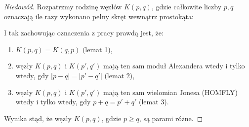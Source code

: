 \begin{proof}[Niedowód]
    Rozpatrzmy rodzinę węzłów $K(p, q)$, gdzie całkowite liczby $p, q$ oznaczają ile razy wykonano pełny skręt wewnątrz prostokąta:
\begin{comment}
    \[
        \begin{tikzpicture}[baseline=-0.65ex,scale=0.08]
        \begin{knot}[clip width=5, flip crossing/.list={1,3,6,7}]
        \strand [thick] (0, 25)
            [in=left, out=right] to (20, 25)
            [in=up, out=right] to (25, 5)
            [in=down, out=down] to (15, 5)
            [in=right, out=up] to (10, 20)
            [in=up, out=left] to (5, 15)
            [in=up, out=down] to (5, 5)
            [in=left, out=down] to (15, -10)
        ;
        \strand [thick] (15, -10)
            [in=down, out=right] to (20, 10)
            [in=up, out=up] to (30, 10)
            [in=right, out=down] to (20, -25)
            [in=down, out=left] to (5, -20)
            [in=down, out=up] to (5, -10)
        ;
        \strand [thick] (5, -10)
            [in=down, out=up] to (15, 0)
            [in=right, out=up] to (0, 5)
            [in=up, out=left] to (-15, 0)
            [in=up, out=down] to (-5, -10)
            ;
        \strand [thick] (-15, -10)
            [in=down, out=left] to (-20, 10)
            [in=up, out=up] to (-30, 10)
            [in=left, out=down] to (-20, -25)
            [in=down, out=right] to (-5, -20)
            [in=down, out=up] to (-5, -10)
        ;
        \strand [thick] (0, 25)
            [in=right, out=left] to (-20, 25)
            [in=up, out=left] to (-25, 5)
            [in=down, out=down] to (-15, 5)
            [in=left, out=up] to (-10, 20)
            [in=up, out=right] to (-5, 15)
            [in=up, out=down] to (-5, 5)
            [in=right, out=down] to (-15, -10)
        ;
        \draw[fill=blue!10!white,thick] (-5, 10) rectangle (5, 15);
        \draw[fill=blue!10!white,thick] (-5, -17.5) rectangle (5, -12.5);
        \node at (0, 12.5) {$p$};
        \node at (0, -15) {$q$};
        \end{knot}
        \end{tikzpicture}
    \]
\end{comment}
    I tak zachowując oznaczenia z pracy \cite{kanenobu1986} prawdą jest, że:
    \begin{enumerate}
        \item $K(p,q) = K(q,p)$ (lemat 1),
        \item węzły $K(p,q)$ i $K(p', q')$ mają ten sam moduł Alexandera wtedy i tylko wtedy, gdy $|p-q| = |p'-q'|$ (lemat 2),
        \item węzły $K(p,q)$ i $K(p', q')$ mają ten sam wielomian Jonesa (HOMFLY) wtedy i tylko wtedy, gdy $p+q = p'+q'$ (lemat 3).
    \end{enumerate}
    Wynika stąd, że węzły $K(p, q)$, gdzie $p \ge q$, są parami różne.
 

\end{proof}
